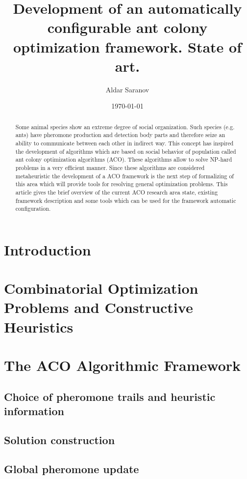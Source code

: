 \documentclass[12pt]{article}
\author{Aldar Saranov}
\date{\today}
\title{Development of an automatically configurable ant colony optimization framework. State of art.}
\begin{document}
\maketitle 
\newpage

\tableofcontents
\newpage

\begin{abstract}
Some animal species show an extreme degree of social organization. Such species (e.g. ants) have pheromone production and detection body parts and therefore seize an ability to communicate between each other in indirect way. This concept has inspired the development of algorithms which are based on social behavior of population called ant colony optimization algorithms (ACO). These algorithms allow to solve NP-hard problems in a very efficient manner. Since these algorithms are considered metaheuristic the development of a ACO framework is the next step of formalizing of this area which will provide tools for resolving general optimization problems. This article gives the brief overview of the current ACO research area state, existing framework description and some tools which can be used for the framework automatic configuration.
\end{abstract}

\section{Introduction}

\section{Combinatorial Optimization Problems and Constructive
Heuristics}

\section{The ACO Algorithmic Framework}

\subsection{Choice of pheromone trails and heuristic information}

\subsection{Solution construction}

\subsection{Global pheromone update}
\end{document}
